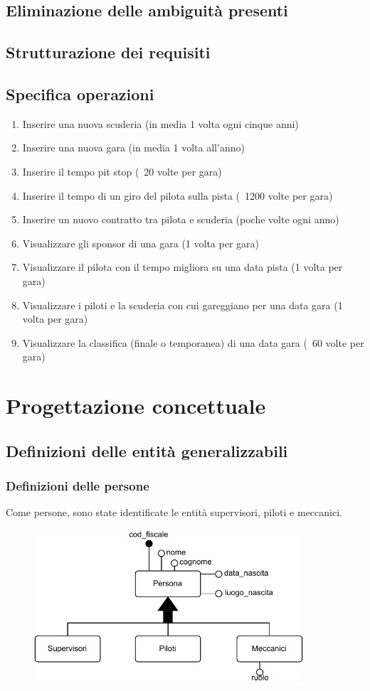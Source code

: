 \documentclass[11pt]{article}
\begin{document}
\subsection{Eliminazione delle ambiguità presenti}
\subsection{Strutturazione dei requisiti}
\subsection{Specifica operazioni}
\begin{enumerate}
    \item Inserire una nuova scuderia (in media 1 volta ogni cinque anni)
    \item Inserire una nuova gara (in media 1 volta all'anno)
    \item Inserire il tempo pit stop (~20 volte per gara)
    \item Inserire il tempo di un giro del pilota sulla pista (~1200 volte per gara)
    \item Inserire un nuovo contratto tra pilota e scuderia (poche volte ogni anno)
    \item Visualizzare gli sponsor di una gara (1 volta per gara)
    \item Visualizzare il pilota con il tempo migliora su una data pista (1 volta per gara)
    \item Visualizzare i piloti e la scuderia con cui gareggiano per una data gara (1 volta per gara)
    \item Visualizzare la classifica (finale o temporanea) di una data gara (~60 volte per gara)
\end{enumerate}

\section{Progettazione concettuale}

\subsection{Definizioni delle entità generalizzabili}
\subsubsection{Definizioni delle persone}
Come persone, sono state identificate le entità supervisori, piloti e meccanici. 
\begin{figure}[H]
    \centering
    \includegraphics[width=10cm]{../er/gare_persone.pdf}
\end{figure}
\end{document}
